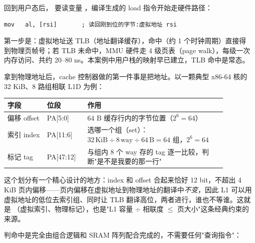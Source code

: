 回到用户态后， 要读变量 ，编译生成的 load 指令开始走硬件路径：

\begin{lstlisting}
mov   al, [rsi]       ; 读回刚到位的字节:虚拟地址 rsi
\end{lstlisting}

第一步是：虚拟地址送 TLB（地址翻译缓存），命中（约 1 个时钟周期）直接得到物理页帧号；若 TLB 未命中，MMU 硬件走 4 级页表（page walk），每级一次内存访问、共约 20--80 ns。本案例中用户栈的映射早已建立，TLB 命中是常态。

拿到物理地址后，cache 控制器做的第一件事是把地址。以一颗典型 x86-64 核的 32 KiB、8 路组相联 L1D 为例：

\begin{longtable}{L{0.16\linewidth}L{0.16\linewidth}L{0.56\linewidth}}
\toprule
字段 & 位段 & 作用 \\
\midrule
偏移 offset & PA[5:0] & 64 B 缓存行内的字节位置（$2^6=64$） \\
索引 index & PA[11:6] & 选哪一个组（set）：$32\,\text{KiB} \div 8\,\text{way} \div 64\,\text{B} = 64$ 组，$2^6=64$ \\
标记 tag & PA[47:12] & 与组内 8 个 way 存的 tag 逐一比较，判断"是不是我要的那一行" \\
\bottomrule
\end{longtable}

这个划分有一个精心设计的地方：index 和 offset 合起来恰好 12 bit，不超出 4 KiB 页内偏移——页内偏移在虚拟地址到物理地址的翻译中\emph{不变}，因此 L1 可以用虚拟地址的低位去索引组、同时让 TLB 翻译高位，两者进行，谁也不等谁。这就是 （虚拟索引、物理标记），也是"L1 容量 $\div$ 相联度 $\le$ 页大小"这条经典约束的来源。

判命中是完全由组合逻辑和 SRAM 阵列配合完成的，不需要任何"查询指令"：

